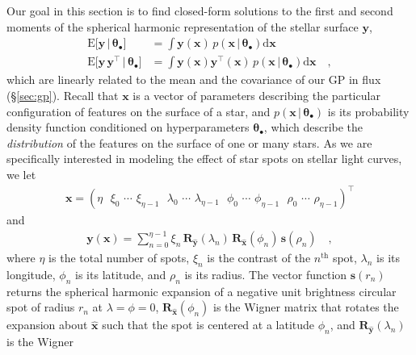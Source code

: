 \documentclass[modern]{aastex62}
\begin{document}
Our goal in this section is to find closed-form solutions to the
first and second moments of the spherical harmonic representation of the
stellar surface $\mathbf{y}$,
%
\begin{align}
    \label{eq:exp_y_app}
    \mathrm{E} \Big[ \mathbf{y} \, \Big| \, \pmb{\theta}_\bullet \Big]
     & =
    \int \mathbf{y}(\mathbf{x} ) \, p(\mathbf{x} \, \big| \, \pmb{\theta}_\bullet)\mathrm{d}\mathbf{x}
    \\
    \label{eq:exp_yy_app}
    \mathrm{E} \Big[ \mathbf{y} \, \mathbf{y}^\top \, \Big| \, \pmb{\theta}_\bullet \Big]
     & =
    \int \mathbf{y}(\mathbf{x} ) \mathbf{y}^\top(\mathbf{x} ) \, p(\mathbf{x} \, \big| \, \pmb{\theta}_\bullet)\mathrm{d}\mathbf{x}
    \quad,
\end{align}
%
which are linearly related to the mean and the covariance of our GP in flux
(\S\ref{sec:gp}).
%
Recall that $\mathbf{x}$ is a vector of parameters describing the particular
configuration of features on the surface of a star, and
$p(\mathbf{x} \, \big| \, \pmb{\theta}_\bullet)$ is its probability
density function conditioned on hyperparameters $\pmb{\theta}_\bullet$,
which describe the \emph{distribution} of the features on the surface
of one or many stars.
%
As we are specifically interested in modeling the effect of star spots
on stellar light curves, we let
%
\begin{align}
    \mathbf{x} =
    \left(
    \eta \,\,\,\,
    \xi_0 \,\, \cdots \,\, \xi_{\eta-1} \,\,\,\,
    \lambda_0 \,\, \cdots \,\, \lambda_{\eta-1} \,\,\,\,
    \phi_0 \,\, \cdots \,\, \phi_{\eta-1} \,\,\,\,
    \rho_0 \,\, \cdots \,\, \rho_{\eta-1}
    \right)^\top
\end{align}
%
and
%
\begin{align}
    \label{eq:RRs}
    \mathbf{y}(\mathbf{x}) =
    \sum_{n=0}^{\eta-1}
    \xi_n
    \,
    \mathbf{R}_{\hat{\mathbf{y}}}(\lambda_n)
    \,
    \mathbf{R}_{\hat{\mathbf{x}}}(\phi_n)
    \,
    \mathbf{s}(\rho_n)
    \quad,
\end{align}
%
where $\eta$ is the total number of spots,
$\xi_n$ is the contrast of the $n^\mathrm{th}$ spot,
$\lambda_n$ is its longitude, $\phi_n$ is its latitude,
and $\rho_n$ is its radius.
The vector function $\mathbf{s}(r_n)$
returns the spherical harmonic expansion of a negative unit brightness
circular spot of radius $r_n$ at $\lambda = \phi = 0$,
$\mathbf{R}_{\hat{\mathbf{x}}}(\phi_n)$ is the Wigner matrix that rotates the
expansion about $\hat{\mathbf{x}}$ such that the spot is centered at a
latitude $\phi_n$, and $\mathbf{R}_{\hat{\mathbf{y}}}(\lambda_n)$ is the Wigner
\end{document}

